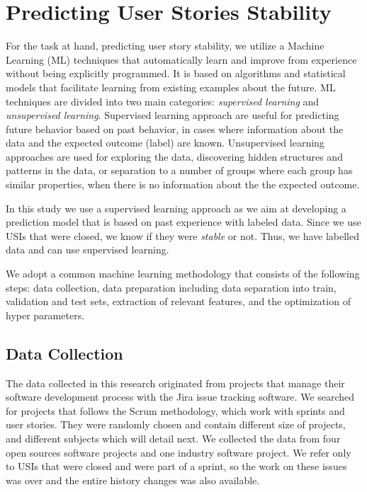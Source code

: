  
\section{Predicting User Stories Stability}
\label{sec-methodology}

For the task at hand, predicting user story stability, we utilize a Machine Learning (ML) techniques that automatically learn and improve from experience without being explicitly programmed. It is based on algorithms and statistical models that facilitate learning from existing examples about the future. ML techniques are divided into two main categories: \textit{supervised learning} and \textit{unsupervised learning}. 
Supervised learning approach are useful for predicting future behavior based on past behavior, in cases where information about the data and the expected outcome (label) are known.
Unsupervised learning approaches are used for exploring the data, discovering hidden structures and patterns in the data, or separation to a number of groups where each group has similar properties, when there is no information about the the expected outcome.


In this study we use a supervised learning approach as we aim at developing a prediction model that is based on past experience with labeled data. Since we use USIs that were closed, we know if they were \emph{stable} or not. Thus, we have labelled data and can use supervised learning.


We adopt a common machine learning methodology that consists of the following steps: data collection, data preparation including data separation into train, validation and test sets, extraction of relevant features, and the optimization of hyper parameters.

\subsection{Data Collection}

The data collected in this research originated from projects that manage their software development process with the Jira issue tracking software. %
We searched for projects that follows the Scrum methodology, which work with sprints and user stories. They were randomly chosen and contain different size of projects, and different subjects which will detail next.
We collected the data from four open sources software projects and one industry software project. We refer only to USIs that were closed and were part of a sprint, so the work on these issues was over and the entire history changes was also available.

